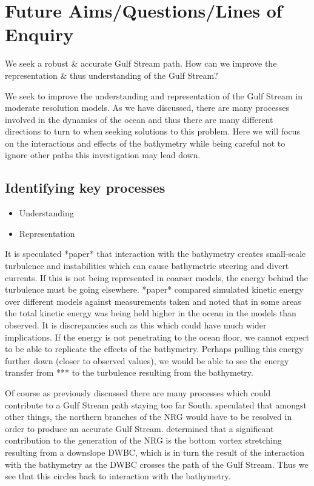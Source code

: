 \documentclass[..\EOYR.tex]{subfiles}
\begin{document}
\section{Future Aims/Questions/Lines of Enquiry }


We seek a robust \& accurate Gulf Stream path. How can we improve the representation \& thus understanding of the Gulf Stream?

We seek to improve the understanding and representation of the Gulf Stream in moderate resolution models. As we have discussed, there are many processes involved in the dynamics of the ocean and thus there are many different directions to turn to when seeking solutions to this problem. Here we will focus on the interactions and effects of the bathymetry while being careful not to ignore other paths this investigation may lead down. 

\subsection{Identifying key processes}
\begin{itemize}
  \item Understanding
  \item Representation
\end{itemize}

It is speculated *paper* that interaction with the bathymetry creates small-scale turbulence and instabilities which can cause bathymetric steering and divert currents. If this is not being represented in coarser models, the energy behind the turbulence must be going elsewhere. *paper* compared simulated kinetic energy over different models against measurements taken and noted that in some areas the total kinetic energy was being held higher in the ocean in the models than observed. It is discrepancies  such as this which could have much wider implications. If the energy is not penetrating to the ocean floor, we cannot expect to be able to replicate the effects of the bathymetry. Perhaps pulling this energy further down (closer to observed values), we would be able to see the energy transfer from *** to the turbulence resulting from the bathymetry. 

Of course as previously discussed there are many processes which could contribute to a Gulf Stream path staying too far South. \citep{Ezer2016b} speculated that amongst other things, the northern branches of the NRG would have to be resolved in order to produce an accurate Gulf Stream. \citep{Zhang2007} determined that a significant contribution to the generation of the NRG is the bottom vortex stretching resulting from a downslope DWBC, which is in turn the result of the interaction with the bathymetry as the DWBC crosses the path of the Gulf Stream. Thus we see that this circles back to interaction with the bathymetry.
\end{document}
